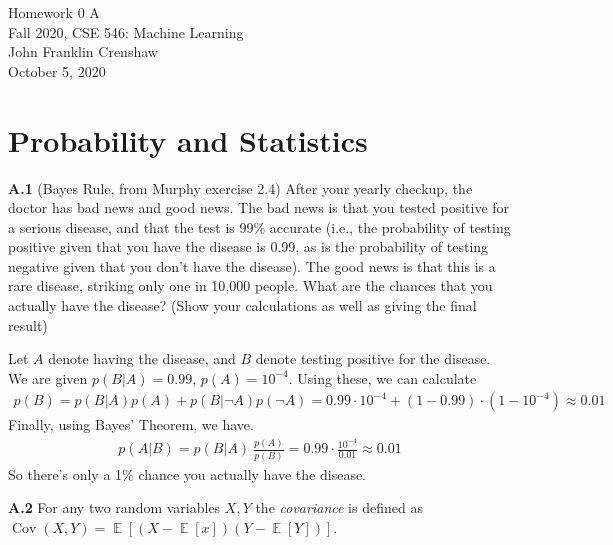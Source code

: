 \documentclass{article}
\DeclareMathOperator{\E}{\mathbb{E}}
\DeclareMathOperator{\cov}{Cov}
\newenvironment{solution}{\begin{adjustwidth}{8mm}{}}{\end{adjustwidth}}
\renewcommand{\title}{Homework 0 A}
\renewcommand{\date}{October 5, 2020}
\begin{document}
\begin{center}
        \LARGE \title \\ \vspace{10pt}
        \normalsize 
        Fall 2020, CSE 546: Machine Learning \\ \vspace{2pt}
        John Franklin Crenshaw \\ \vspace{2pt}
        \date
\end{center}


\section*{Probability and Statistics}

\textbf{A.1} 
(Bayes Rule, from Murphy exercise 2.4) 
After your yearly checkup, the doctor has bad news and good news. 
The bad news is that you tested positive for a serious disease, and that the test is 99\% accurate (i.e., the probability of testing positive given that you have the disease is 0.99, as is the probability of testing negative given that you don't have the disease).
The good news is that this is a rare disease, striking only one in 10,000 people. 
What are the chances that you actually have the disease?
(Show your calculations as well as giving the final result) \newline

\begin{solution}
        Let $A$ denote having the disease, and $B$ denote testing positive for the disease.
        We are given $p(B|A) = 0.99$, $p(A) = 10^{-4}$.
        Using these, we can calculate 
        \begin{align*}
                p(B) = p(B|A)p(A) + p(B|\neg A)p(\neg A) = 0.99 \cdot 10^{-4} + (1-0.99) \cdot (1-10^{-4}) \approx 0.01
        \end{align*}
        Finally, using Bayes' Theorem, we have.
        \begin{align*}
                p(A|B) = p(B|A) ~ \frac{p(A)}{p(B)} = 0.99 \cdot \frac{10^{-4}}{0.01} \approx 0.01
        \end{align*}
        So there's only a 1\% chance you actually have the disease.
\end{solution} \vspace{10pt}


\textbf{A.2}
For any two random variables $X,Y$ the \textit{covariance} is defined as $\cov(X,Y) = \E[(X - \E[x])(Y- \E[Y])]$.
\end{document}
